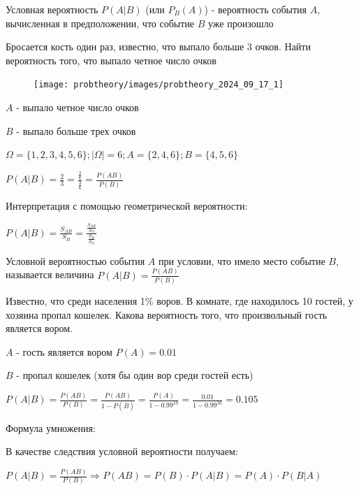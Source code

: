 \documentclass[12pt]{article}
\begin{document}
    Условная вероятность $P(A|B)$ (или $P_B(A)$) - вероятность события $A$, вычисленная в предположении, что событие $B$ уже произошло

    \Ex Бросается кость один раз, известно, что выпало больше 3 очков. Найти вероятность того, что выпало четное число очков

    \smallvspace

    \begin{minipage}{\linewidth}
        \begin{figure}
            \begin{center}
                \texttt{[image: probtheory/images/probtheory\_2024\_09\_17\_1]}
            \end{center}
        \end{figure}

        $A$ - выпало четное число очков

        $B$ - выпало больше трех очков

        $\Omega = \{1, 2, 3, 4, 5, 6\}; |\Omega| = 6; A = \{2, 4, 6\}; B = \{4, 5, 6\}$

        $P(A|B) = \frac{2}{3} = \frac{\frac{2}{6}}{\frac{3}{6}} = \frac{P(AB)}{P(B)}$


        Интерпретация с помощью геометрической вероятности:

        $P(A|B) = \frac{S_{AB}}{S_B} = \frac{\frac{S_{AB}}{S_\Omega}}{\frac{S_B}{S_\Omega}}$
    \end{minipage}

    \Def Условной вероятностью события $A$ при условии, что имело место событие $B$, называется величина $P(A|B) = \frac{P(AB)}{P(B)}$

    \Ex Известно, что среди населения 1\% воров. В комнате, где находилось 10 гостей, у хозяина пропал кошелек. Какова вероятность того, что произвольный гость является вором.

    $A$ - гость является вором $P(A) = 0.01$

    $B$ - пропал кошелек (хотя бы один вор среди гостей есть)

    $P(A|B) = \frac{P(AB)}{P(B)} = \frac{P(AB)}{1 - P(\overline{B})} = \frac{P(A)}{1 - 0.99^{10}} = \frac{0.01}{1 - 0.99^{10}} = 0.105$

    \hypertarget{eventsmultiplicationformula}{}

    Формула умножения:

    В качестве следствия условной вероятности получаем:

    $P(A|B) = \frac{P(AB)}{P(B)} \Longrightarrow P(AB) = P(B) \cdot P(A|B) = P(A) \cdot P(B|A)$
\end{document}
